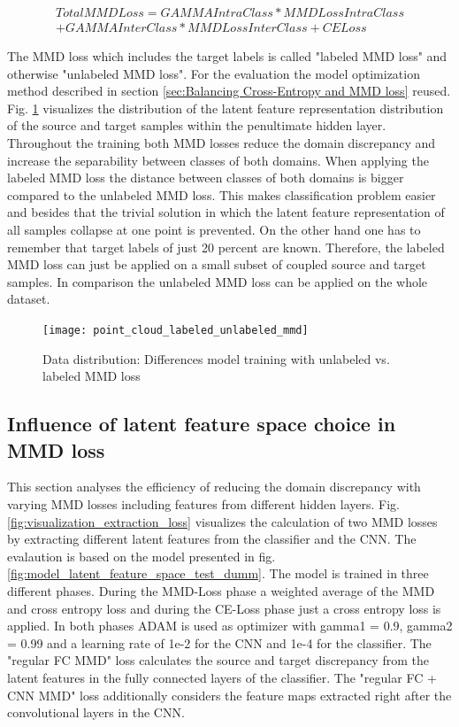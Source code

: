 \begin{equation}
\begin{split}
    TotalMMDLoss = GAMMAIntraClass * MMDLossIntraClass\\ + GAMMAInterClass * MMDLossInterClass + CELoss
\end{split}
\end{equation}

 The MMD loss which includes the target labels is called "labeled MMD loss" and otherwise "unlabeled MMD loss". For the evaluation the model optimization method described in section \ref{sec:Balancing Cross-Entropy and MMD loss} reused. Fig. \ref{fig:point_cloud_labeled_unlabeled_mmd} visualizes the distribution of the latent feature representation distribution of the source and target samples within the penultimate hidden layer. Throughout the training both MMD losses reduce the domain discrepancy and increase the separability between classes of both domains. When applying the labeled MMD loss the distance between classes of both domains is bigger compared to the unlabeled MMD loss. This makes classification problem easier and besides that the trivial solution in which the latent feature representation of all samples collapse at one point is prevented. On the other hand one has to remember that target labels of just 20 percent are known. Therefore, the labeled MMD loss can just be applied on a small subset of coupled source and target samples. In comparison the unlabeled MMD loss can be applied on the whole dataset.
 
\begin{figure}[htpb]
  \centering
  \texttt{[image: point\_cloud\_labeled\_unlabeled\_mmd]}
  \caption {Data distribution: Differences model training with unlabeled vs. labeled MMD loss} \label{fig:point_cloud_labeled_unlabeled_mmd}
\end{figure}



\subsection{Influence of latent feature space choice in MMD loss}
This section analyses the efficiency of reducing the domain discrepancy with varying MMD losses including features from different hidden layers. Fig. \ref{fig:visualization_extraction_loss} visualizes the calculation of two MMD losses by extracting different latent features from the classifier and the CNN. The evalaution is based on the model presented in fig. \ref{fig:model_latent_feature_space_test_dumm}. The model is trained in three different phases. During the MMD-Loss phase a weighted average of the MMD and cross entropy loss and during the CE-Loss phase just a cross entropy loss is applied. In both phases ADAM is used as optimizer with gamma1 = 0.9, gamma2 = 0.99 and a learning rate of 1e-2 for the CNN and 1e-4 for the classifier. The "regular FC MMD" loss calculates the source and target discrepancy from the latent features in the fully connected layers of the classifier. The "regular FC + CNN MMD" loss additionally considers the feature maps extracted right after the convolutional layers in the CNN. 

